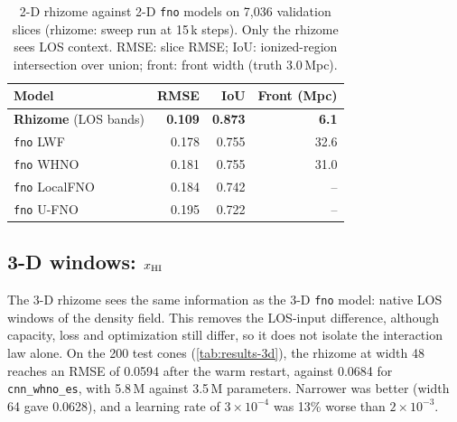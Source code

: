 \begin{table}[!htbp]
  \centering
  \caption{2-D rhizome against 2-D \texttt{fno} models on 7,036 validation slices (rhizome: sweep run at 15\,k steps). Only the rhizome sees LOS context. RMSE: slice RMSE; IoU: ionized-region intersection over union; front: front width (truth 3.0\,Mpc).}
  \label{tab:results-2d}
  \small
  \begin{tabular}{@{}lrrr@{}}
    \toprule
    Model & RMSE & IoU & Front (Mpc) \\
    \midrule
    \textbf{Rhizome} (LOS bands) & \textbf{0.109} & \textbf{0.873} & \textbf{6.1} \\
    \texttt{fno} LWF & 0.178 & 0.755 & 32.6 \\
    \texttt{fno} WHNO & 0.181 & 0.755 & 31.0 \\
    \texttt{fno} LocalFNO & 0.184 & 0.742 & -- \\
    \texttt{fno} U-FNO & 0.195 & 0.722 & -- \\
    \bottomrule
  \end{tabular}
\end{table}

\subsection{3-D windows: \texorpdfstring{$x_{\mathrm{HI}}$}{xHI}}
\label{sec:results-3d}

The 3-D rhizome sees the same information as the 3-D \texttt{fno} model: native LOS windows of the density field. This removes the LOS-input difference, although capacity, loss and optimization still differ, so it does not isolate the interaction law alone. On the 200 test cones (\cref{tab:results-3d}), the rhizome at width 48 reaches an RMSE of 0.0594 after the warm restart, against 0.0684 for \texttt{cnn\_whno\_es}, with 5.8\,M against 3.5\,M parameters. Narrower was better (width 64 gave 0.0628), and a learning rate of $3\times10^{-4}$ was 13\% worse than $2\times10^{-3}$.

